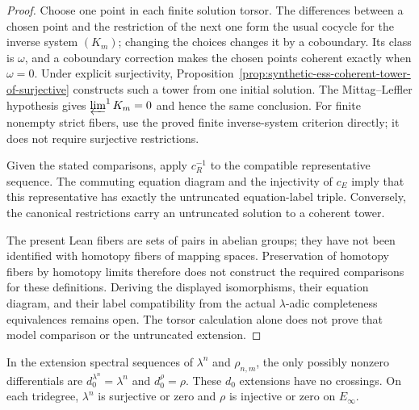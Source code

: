 \begin{proof}
  Choose one point in each finite solution torsor.  The differences between a
  chosen point and the restriction of the next one form the usual cocycle for
  the inverse system $(K_m)$; changing the choices changes it by a coboundary.
  Its class is $\omega$, and a coboundary correction makes the chosen points
  coherent exactly when $\omega=0$.  Under explicit surjectivity,
  Proposition~\ref{prop:synthetic-ess-coherent-tower-of-surjective}
  constructs such a tower from one initial solution.  The
  Mittag--Leffler hypothesis gives
  $\varprojlim^1K_m=0$ and hence the same conclusion.
  For finite nonempty strict fibers, use the proved finite inverse-system
  criterion directly; it does not require surjective restrictions.

  Given the stated comparisons, apply $c_R^{-1}$ to the compatible
  representative sequence.  The commuting equation diagram and the
  injectivity of $c_E$ imply that this representative has exactly the
  untruncated equation-label triple.  Conversely, the canonical
  restrictions carry an untruncated solution to a coherent tower.

  The present Lean fibers are sets of pairs in abelian groups; they have
  not been identified with homotopy fibers of mapping spaces.  Preservation
  of homotopy fibers by homotopy limits therefore does not construct the
  required comparisons for these definitions.  Deriving the displayed
  isomorphisms, their equation diagram, and their label compatibility from
  the actual $\lambda$-adic completeness equivalences remains open.
  The torsor calculation alone does not prove that model comparison or
  the untruncated extension.
\end{proof}

\begin{proposition}
  \label{prop:lambda-rho-ess-only-d0}
  \notready
  In the extension spectral sequences of $\lambda^n$ and $\rho_{n,m}$, the
  only possibly nonzero differentials are
  $d_0^{\lambda^n}=\lambda^n$ and $d_0^\rho=\rho$.  These $d_0$ extensions have
  no crossings.  On each tridegree, $\lambda^n$ is surjective or zero and
  $\rho$ is injective or zero on $E_\infty$.
\end{proposition}

